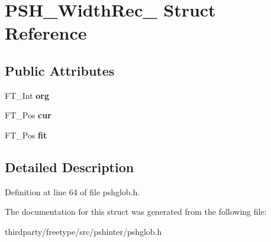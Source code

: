 \hypertarget{struct_p_s_h___width_rec__}{}\section{P\+S\+H\+\_\+\+Width\+Rec\+\_\+ Struct Reference}
\label{struct_p_s_h___width_rec__}
\subsection*{Public Attributes}
\begin{DoxyCompactItemize}
\item 
\mbox{\label{struct_p_s_h___width_rec___a022acc48f09b5c56516af83158a8dcbb}} 
F\+T\+\_\+\+Int {\bfseries org}
\item 
\mbox{\label{struct_p_s_h___width_rec___a2478a2f260d16c420f2d885b0ef91cb3}} 
F\+T\+\_\+\+Pos {\bfseries cur}
\item 
\mbox{\label{struct_p_s_h___width_rec___ad6263a5fd5199c57e7bebf51faa08142}} 
F\+T\+\_\+\+Pos {\bfseries fit}
\end{DoxyCompactItemize}


\subsection{Detailed Description}


Definition at line 64 of file pshglob.\+h.



The documentation for this struct was generated from the following file\+:\begin{DoxyCompactItemize}
\item 
thirdparty/freetype/src/pshinter/pshglob.\+h\end{DoxyCompactItemize}
